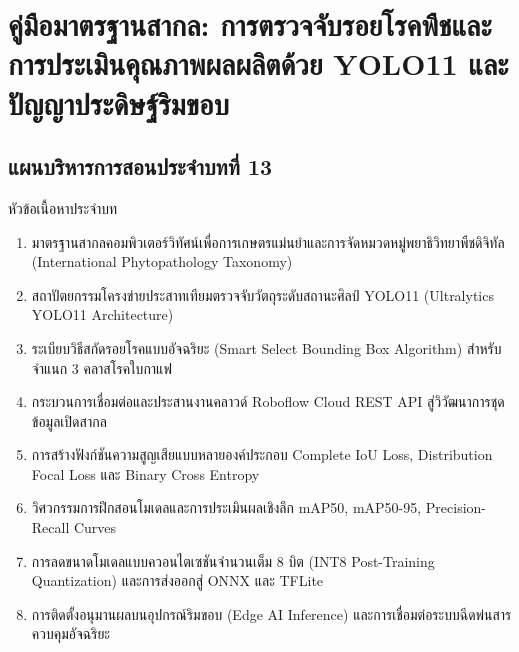 \chapter{คู่มือมาตรฐานสากล: การตรวจจับรอยโรคพืชและการประเมินคุณภาพผลผลิตด้วย YOLO11 และปัญญาประดิษฐ์ริมขอบ}
\label{chap:ch13}

\section*{แผนบริหารการสอนประจำบทที่ 13}

\begin{planbox}{หัวข้อเนื้อหาประจำบท}
\begin{enumerate}[topsep=2pt, itemsep=1pt, partopsep=0pt, parsep=0pt, leftmargin=1.5em]
    \item มาตรฐานสากลคอมพิวเตอร์วิทัศน์เพื่อการเกษตรแม่นยำและการจัดหมวดหมู่พยาธิวิทยาพืชดิจิทัล (International Phytopathology Taxonomy)
    \item สถาปัตยกรรมโครงข่ายประสาทเทียมตรวจจับวัตถุระดับสถานะศิลป์ YOLO11 (Ultralytics YOLO11 Architecture)
    \item ระเบียบวิธีสกัดรอยโรคแบบอัจฉริยะ (Smart Select Bounding Box Algorithm) สำหรับจำแนก 3 คลาสโรคใบกาแฟ
    \item กระบวนการเชื่อมต่อและประสานงานคลาวด์ Roboflow Cloud REST API สู่วิวัฒนาการชุดข้อมูลเปิดสากล
    \item การสร้างฟังก์ชันความสูญเสียแบบหลายองค์ประกอบ Complete IoU Loss, Distribution Focal Loss และ Binary Cross Entropy
    \item วิศวกรรมการฝึกสอนโมเดลและการประเมินผลเชิงลึก mAP50, mAP50-95, Precision-Recall Curves
    \item การลดขนาดโมเดลแบบควอนไตเซชันจำนวนเต็ม 8 บิต (INT8 Post-Training Quantization) และการส่งออกสู่ ONNX และ TFLite
    \item การติดตั้งอนุมานผลบนอุปกรณ์ริมขอบ (Edge AI Inference) และการเชื่อมต่อระบบฉีดพ่นสารควบคุมอัจฉริยะ
\end{enumerate}
\end{planbox}

